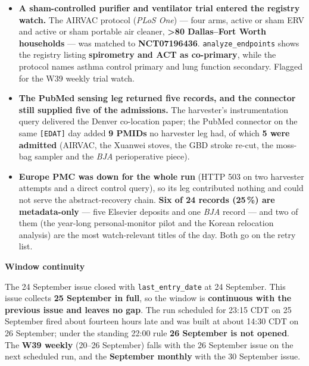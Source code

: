 \documentclass[10pt]{article}
\begin{document}
\begin{itemize}
\item \textbf{A sham-controlled purifier and ventilator trial entered the registry watch.} The
AIRVAC protocol (\textit{PLoS One}) --- four arms, active or sham ERV and active or sham
portable air cleaner, \textbf{>80 Dallas--Fort Worth households} --- was matched to
\textbf{NCT07196436}. \texttt{analyze\_endpoints} shows the registry listing
\textbf{spirometry and ACT as co-primary}, while the protocol names asthma control primary and
lung function secondary. Flagged for the W39 weekly trial watch.

\item \textbf{The PubMed sensing leg returned five records, and the connector still supplied five
of the admissions.} The harvester's instrumentation query delivered the Denver co-location paper;
the PubMed connector on the same \texttt{[EDAT]} day added \textbf{9 PMIDs} no harvester leg
had, of which \textbf{5 were admitted} (AIRVAC, the Xuanwei stoves, the GBD stroke re-cut, the
moss-bag sampler and the \textit{BJA} perioperative piece).

\item \textbf{Europe PMC was down for the whole run} (HTTP 503 on two harvester attempts and a
direct control query), so its leg contributed nothing and could not serve the abstract-recovery
chain. \textbf{Six of 24 records (25\,\%) are metadata-only} --- five Elsevier deposits and one
\textit{BJA} record --- and two of them (the year-long personal-monitor pilot and the Korean
relocation analysis) are the most watch-relevant titles of the day. Both go on the retry list.

\end{itemize}

\vspace{2mm}

\begin{keybox}
{\sffamily\bfseries\footnotesize\color{Deep}Window continuity}\\[1.2mm]
{\fontsize{7.2}{8.8}\selectfont
The 24 September issue closed with \texttt{last\_entry\_date} at 24 September. This issue
collects \textbf{25 September in full}, so the window is \textbf{continuous with the previous
issue and leaves no gap}. The run scheduled for 23:15 CDT on 25 September fired about fourteen
hours late and was built at about 14:30 CDT on 26 September; under the standing 22:00 rule
\textbf{26 September is not opened}. The \textbf{W39 weekly} (20--26 September) falls with the
26 September issue on the next scheduled run, and the \textbf{September monthly} with the
30 September issue.\par}
\end{keybox}
\end{document}
